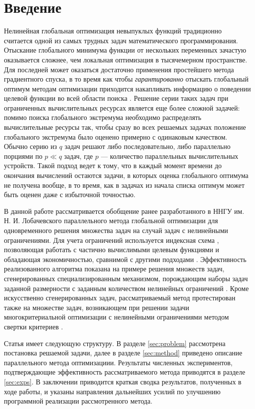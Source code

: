 \documentclass{cmi}
\begin{document}
\section*{Введение}
\label{sec-intro}
Нелинейная глобальная оптимизация невыпуклых функций традиционно считается одной из самых трудных
задач математического программирования. Отыскание глобального минимума функции от нескольких переменных
зачастую оказывается сложнее, чем локальная оптимизация в тысячемерном пространстве. Для последней может оказаться достаточно
применения простейшего метода градиентного спуска, в то время как чтобы \textit{гарантированно} отыскать глобальный оптимум методам
оптимизации приходится накапливать информацию о поведении целевой функции во всей области поиска \cite{Jones2009,Paulavicius2011,Evtushenko2013,Strongin2000}. Решение серии таких задач при ограниченных вычислительных
ресурсах является еще более сложной задачей: помимо поиска глобального экстремума необходимо
распределять вычислительные ресурсы так, чтобы сразу во всех решаемых задачах положение глобального
экстремума было оценено примерно с одинаковым качеством. Обычно серию из \(q\) задач решают либо последовательно, либо
параллельно порциями по \(p\ll q\) задач, где \(p\) --- количество параллельных вычислительных устройств.
Такой подход ведет к тому, что в каждый момент времени до окончания вычислений
остаются задачи, в которых оценка глобального оптимума не получена вообще, в то время, как в задачах из начала
списка оптимум может быть оценен даже с избыточной точностью.

В данной работе рассматривается обобщение ранее разработанного в ННГУ им. Н. И. Лобачевского
параллельного метода глобальной оптимизации для одновременного решения множества задач \cite{BarkalovStrongin2018} на
случай задач с нелинейными ограничениями. Для учета ограничений используется индексная схема \cite{Strongin2000},
позволяющая работать с частично вычислимыми целевым функциями и обладающая экономичностью,
сравнимой с другими подходами \cite{BarkalovLebedev2017}. Эффективность реализованного
алгоритма показана на примере решения множеств задач, сгенерированных специализированным
механизмом, порождающим наборы задач заданной размерности с заданным количеством нелинейных ограничений \cite{GergelBarkalov2019}.
Кроме искусственно сгенерированных задач, рассматриваемый метод протестирован также
на множестве задач, возникающем при решении задачи многокритериальной оптимизации
с нелинейными ограничениями методом свертки критериев \cite{Ehrgott2005}.

Статья имеет следующую структуру. В разделе \ref{sec:problem} рассмотрена
постановка решаемой задачи, далее в разделе \ref{sec:method} приведено описание
параллельного метода оптимизациии. Результаты численных экспериментов, подтверждающие
эффективность рассматриваемого метода приводятся в разделе \ref{sec:exps}.
В заключении приводится краткая сводка результатов, полученных в ходе работы, и
указаны направления дальнейших усилий по улучшению программной реализации рассмотренного метода.
\end{document}

